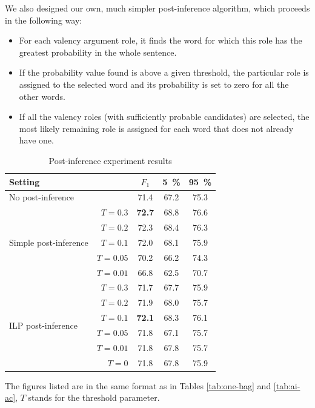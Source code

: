 \documentclass[12pt,notitlepage,a4paper]{report}
\begin{document}
We also designed our own, much simpler post-inference algorithm, which proceeds in the following way:
\begin{itemize}
    \item For each valency argument role, it finds the word for which this role has the greatest probability in the whole sentence.
    \item If the probability value found is above a given threshold, the particular role is assigned to the selected word and its probability is set to zero for all the other words.
    \item If all the valency roles (with sufficiently probable candidates) are selected, the most likely remaining role is assigned for each word that does not already have one.
\end{itemize}

\begin{table}[htb]\label{tab:post-inference}
\caption{Post-inference experiment results}\footnotesize
\begin{center}
\begin{tabular}{|lr|c|c|c|}\hline
\multicolumn{2}{|l|}{\bf Setting} & $F_1$ & \bf 5~\% & \bf 95~\% \\\hline
\multicolumn{2}{|l|}{No post-inference} & 71.4 & 67.2 & 75.3 \\\hline
\multirow{5}{*}{Simple post-inference} & $T = 0.3$ & \bf 72.7 & 68.8 & 76.6 \\
& $T = 0.2$ & 72.3 & 68.4 & 76.3 \\
& $T = 0.1$ & 72.0 & 68.1 & 75.9 \\
& $T = 0.05$ & 70.2 & 66.2 & 74.3 \\
& $T = 0.01$ & 66.8 & 62.5 & 70.7 \\\hline
\multirow{6}{*}{ILP post-inference} & $T = 0.3$ & 71.7 & 67.7 & 75.9 \\
& $T = 0.2$ & 71.9 & 68.0 & 75.7 \\
& $T = 0.1$ & \bf 72.1 & 68.3 & 76.1 \\
& $T = 0.05$ & 71.8 & 67.1 & 75.7 \\
& $T = 0.01$ & 71.8 & 67.8 & 75.7 \\
& $T = 0$ & 71.8 & 67.8 & 75.9 \\\hline
\end{tabular}
\end{center}
The figures listed are in the same format as in Tables \ref{tab:one-bag} and \ref{tab:ai-ac}, $T$ stands for the threshold parameter.
\end{table}
\end{document}
